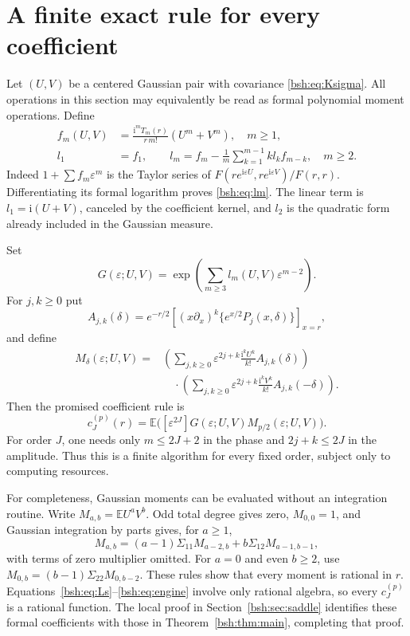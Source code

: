 \documentclass[11pt,letterpaper]{article}
\theoremstyle{remark}\newtheorem{remark}[theorem]{Remark}
\newcommand{\E}{\mathbb E}
\newcommand{\ii}{\mathrm i}
\begin{document}
\section{A finite exact rule for every coefficient}\label{bsh:sec:engine}
Let $(U,V)$ be a centered Gaussian pair with covariance \eqref{bsh:eq:Ksigma}. All operations in this section may equivalently be read as formal polynomial moment operations. Define
\begin{align}
 f_m(U,V)&=\frac{\ii^m T_m(r)}{r\,m!}(U^m+V^m),\quad m\geq1,\label{bsh:eq:fm}\\
 l_1&=f_1,\qquad
 l_m=f_m-\frac1m\sum_{k=1}^{m-1}k l_k f_{m-k},\quad m\geq2.\label{bsh:eq:lm}
\end{align}
Indeed $1+\sum f_m\varepsilon^m$ is the Taylor series of $F(re^{\ii\varepsilon U},re^{\ii\varepsilon V})/F(r,r)$. Differentiating its formal logarithm proves \eqref{bsh:eq:lm}. The linear term is $l_1=\ii(U+V)$, canceled by the coefficient kernel, and $l_2$ is the quadratic form already included in the Gaussian measure.

Set
\begin{equation}\label{bsh:eq:G}
 G(\varepsilon;U,V)=\exp\left(\sum_{m\geq3}l_m(U,V)\varepsilon^{m-2}\right).
\end{equation}
For $j,k\geq0$ put
\begin{equation}\label{bsh:eq:Ajk}
 A_{j,k}(\delta)=e^{-r/2}
 \left[(x\partial_x)^k\{e^{x/2}P_j(x,\delta)\}\right]_{x=r},
\end{equation}
and define
\begin{align}
 M_\delta(\varepsilon;U,V)
 ={}&\left(\sum_{j,k\geq0}\varepsilon^{2j+k}
          \frac{\ii^kU^k}{k!}A_{j,k}(\delta)\right)\nonumber\\
 &\quad\cdot\left(\sum_{j,k\geq0}\varepsilon^{2j+k}
          \frac{\ii^kV^k}{k!}A_{j,k}(-\delta)\right).\label{bsh:eq:M}
\end{align}
Then the promised coefficient rule is
\begin{equation}\label{bsh:eq:engine}
 \boxed{\quad c_J^{(p)}(r)=
 \E\bigl([\varepsilon^{2J}]G(\varepsilon;U,V)M_{p/2}(\varepsilon;U,V)\bigr).\quad}
\end{equation}
For order $J$, one needs only $m\leq2J+2$ in the phase and $2j+k\leq2J$ in the amplitude. Thus this is a finite algorithm for every fixed order, subject only to computing resources.

For completeness, Gaussian moments can be evaluated without an integration routine. Write $M_{a,b}=\E U^aV^b$. Odd total degree gives zero, $M_{0,0}=1$, and Gaussian integration by parts gives, for $a\geq1$,
\[
 M_{a,b}=(a-1)\Sigma_{11}M_{a-2,b}+b\Sigma_{12}M_{a-1,b-1},
\]
with terms of zero multiplier omitted. For $a=0$ and even $b\geq2$, use $M_{0,b}=(b-1)\Sigma_{22}M_{0,b-2}$. These rules show that every moment is rational in $r$. Equations~\eqref{bsh:eq:Ls}--\eqref{bsh:eq:engine} involve only rational algebra, so every $c_J^{(p)}$ is a rational function. The local proof in Section~\ref{bsh:sec:saddle} identifies these formal coefficients with those in Theorem~\ref{bsh:thm:main}, completing that proof.
\end{document}
